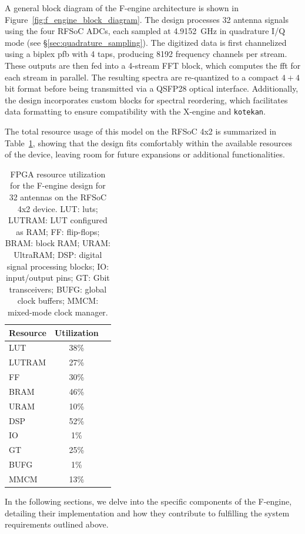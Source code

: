 A general block diagram of the F-engine architecture is shown in Figure~\ref{fig:f_engine_block_diagram}. The design processes 32 antenna signals using the four RFSoC ADCs, each sampled at \SI{4.9152}{\giga\hertz} in quadrature I/Q mode (see \S\ref{sec:quadrature_sampling}). The digitized data is first channelized using a biplex \gls{pfb} with 4 taps, producing 8192 frequency channels per stream. These outputs are then fed into a 4-stream FFT block, which computes the \gls{fft} for each stream in parallel. The resulting spectra are re-quantized to a compact $4+4$ bit format before being transmitted via a QSFP28 optical interface. Additionally, the design incorporates custom blocks for spectral reordering, which facilitates data formatting to ensure compatibility with the X-engine and \texttt{kotekan}.

The total resource usage of this model on the RFSoC 4x2 is summarized in Table~\ref{tab:f_engine_resource_usage}, showing that the design fits comfortably within the available resources of the device, leaving room for future expansions or additional functionalities.

\begin{table}[t]
\centering
\caption[FPGA resource utilization for the F-engine design]{FPGA resource utilization for the F-engine design for 32 antennas on the RFSoC 4x2 device. LUT: \glspl{lut}; LUTRAM: LUT configured as RAM; FF: flip-flops; BRAM: block RAM; URAM: UltraRAM; DSP: digital signal processing blocks; IO: input/output pins; GT: Gbit transceivers; BUFG: global clock buffers; MMCM: mixed-mode clock manager.}
\begin{tabular}{lcc}
\toprule
\textbf{Resource} & \textbf{Utilization} & \\
\midrule
LUT      & 38\% \\
LUTRAM   & 27\% \\
FF       & 30\% \\
BRAM     & 46\% \\
URAM     & 10\% \\
DSP      & 52\% \\
IO       & 1\%  \\
GT       & 25\% \\
BUFG     & 1\%  \\
MMCM     & 13\% \\
\bottomrule
\end{tabular}
\label{tab:f_engine_resource_usage}
\end{table}

In the following sections, we delve into the specific components of the F-engine, detailing their implementation and how they contribute to fulfilling the system requirements outlined above.

